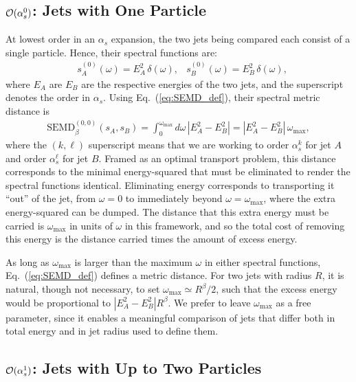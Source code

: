 \documentclass[letterpaper,11pt]{article}
\DeclareRobustCommand{\Eq}[1]{Eq.~(\ref{#1})}
\begin{document}
\subsection{${\cal O}(\alpha_s^0)$: Jets with One Particle}
\label{sec:one_particle}

At lowest order in an $\alpha_s$ expansion, the two jets being compared each consist of a single particle.
%
Hence, their spectral functions are:
%
\begin{align}
&s_A^{(0)}(\omega) = E_A^2\,\delta(\omega),&s^{(0)}_B(\omega) = E_B^2\,\delta(\omega),
\end{align}
%
where $E_A$ are $E_B$ are the respective energies of the two jets, and the superscript denotes the order in $\alpha_s$.
%
Using \Eq{eq:SEMD_def}, their spectral metric distance is 
%
\begin{align}
\label{eq:SEMD_00}
\text{SEMD}^{(0,0)}_{\beta}(s_A, s_B) = \int_0^{\omega_{\max}}  d\omega \, |E_A^2-E_B^2| = |E_A^2-E_B^2|\,\omega_{\max},
\end{align}
%
where the $(k,\ell)$ superscript means that we are working to order $\alpha_s^k$ for jet $A$ and order $\alpha_s^\ell$ for jet $B$. 
%
Framed as an optimal transport problem, this distance corresponds to the minimal energy-squared that must be eliminated to render the spectral functions identical.
%
Eliminating energy corresponds to transporting it ``out'' of the jet, from $\omega=0$ to immediately beyond $\omega=\omega_{\max}$, where the extra energy-squared can be dumped.
%
The distance that this extra energy must be carried is $\omega_{\max}$ in units of $\omega$ in this framework, and so the total cost of removing this energy is the distance carried times the amount of excess energy.


As long as $\omega_{\max}$ is larger than the maximum $\omega$ in either spectral functions, \Eq{eq:SEMD_def} defines a metric distance.
%
For two jets with radius $R$, it is natural, though not necessary, to set $\omega_{\max} \simeq R^\beta / 2$, such that the excess energy would be proportional to $|E_A^2-E_B^2|R^\beta$.
%
We prefer to leave $\omega_{\max}$ as a free parameter, since it enables a meaningful comparison of jets that differ both in total energy and in jet radius used to define them.



\subsection{${\cal O}(\alpha_s^1)$: Jets with Up to Two Particles}
\label{sec:two_particles}
\end{document}
